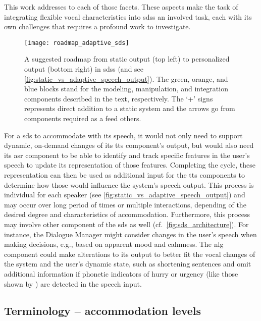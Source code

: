 This work addresses to each of those facets.
These aspects make the task of integrating flexible vocal characteristics into \acp{sds} an involved task, each with its own challenges that requires a profound work to investigate.
%
\begin{figure}[t]
	\centering
	\texttt{[image: roadmap\_adaptive\_sds]}
	\caption[Roadmap to phonetically adaptive \acl{sds}]
		{A suggested roadmap from static output (top left) to personalized output (bottom right) in \acp{sds} (and see \cref{fig:static_vs_adaptive_speech_output}).
		The green, orange, and blue blocks stand for the modeling, manipulation, and integration components described in the text, respectively.
		The \enquote*{+} signs represents direct addition to a static system and the arrows go from components required as a feed others.}
	\label{fig:roadmap_adaptive_sds}
\end{figure}
%
For a \ac{sds} to accommodate with its speech, it would not only need to support dynamic, on-demand changes of its \ac{tts} component's output, but would also need its \ac{asr} component to be able to identify and track specific features in the user's speech to update its representation of those features.
Completing the cycle, these representation can then be used as additional input for the \ac{tts} components to determine how those would influence the system's speech output.
This process is individual for each speaker (see \cref{fig:static_vs_adaptive_speech_output}) and may occur over long period of times or multiple interactions, depending of the desired degree and characteristics of accommodation.
Furthermore, this process may involve other component of the \ac{sds} as well (cf.\ \cref{fig:sds_architecture}).
For instance, the Dialogue Manager might consider changes in the user's speech when making decisions, e.g., based on apparent mood and calmness.
The \ac{nlg} component could make alterations to its output to better fit the vocal changes of the system and the user's dynamic state, such as shortening sentences and omit additional information if phonetic indicators of hurry or urgency (like those shown by \citet{Edworthy2003acoustic}) are detected in the speech input.

\subsection{Terminology -- accommodation levels}
\label{subsec:accommodation_levels}

